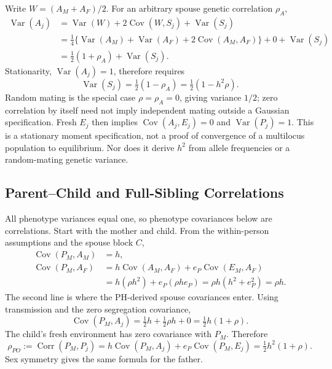 Write $W=(A_M+A_F)/2$. For an arbitrary spouse genetic correlation
$\rho_A$,
\begin{align*}
 \operatorname{Var}(A_j)
 &=\operatorname{Var}(W)+2\operatorname{Cov}(W,S_j)
   +\operatorname{Var}(S_j)\\
 &=\tfrac14\{\operatorname{Var}(A_M)+\operatorname{Var}(A_F)
              +2\operatorname{Cov}(A_M,A_F)\}
   +0+\operatorname{Var}(S_j)\\
 &=\tfrac12(1+\rho_A)+\operatorname{Var}(S_j).
\end{align*}
Stationarity, $\operatorname{Var}(A_j)=1$, therefore requires
\begin{equation}
 \boxed{\operatorname{Var}(S_j)=\tfrac12(1-\rho_A)
          =\tfrac12(1-h^2\rho).}
 \label{eq:model-segregation}
\end{equation}
Random mating is the special case $\rho=\rho_A=0$, giving variance
$1/2$; zero correlation by itself need not imply independent mating
outside a Gaussian specification. Fresh $E_j$ then implies
$\operatorname{Cov}(A_j,E_j)=0$ and $\operatorname{Var}(P_j)=1$.
This is a stationary moment specification, not a proof of convergence
of a multilocus population to equilibrium. Nor does it derive $h^2$
from allele frequencies or a random-mating genetic variance.

\subsection{Parent--Child and Full-Sibling Correlations}
\label{sec:model-nuclear}

All phenotype variances equal one, so phenotype covariances below
are correlations. Start with the mother and child. From the
within-person assumptions and the spouse block $C$,
\begin{align*}
 \operatorname{Cov}(P_M,A_M)&=h,\\
 \operatorname{Cov}(P_M,A_F)
 &=h\operatorname{Cov}(A_M,A_F)+e_P\operatorname{Cov}(E_M,A_F)\\
 &=h(\rho h^2)+e_P(\rho h e_P)
   =\rho h(h^2+e_P^2)=\rho h.
\end{align*}
The second line is where the PH-derived spouse covariances enter.
Using transmission and the zero segregation covariance,
\[
 \operatorname{Cov}(P_M,A_j)
 =\tfrac12 h+\tfrac12\rho h+0=\tfrac12h(1+\rho).
\]
The child's fresh environment has zero covariance with $P_M$. Therefore
\begin{equation}
 \rho_{PO}:=\operatorname{Corr}(P_M,P_j)
 =h\operatorname{Cov}(P_M,A_j)+e_P\operatorname{Cov}(P_M,E_j)
 =\boxed{\tfrac12h^2(1+\rho).}
 \label{eq:po}
\end{equation}
Sex symmetry gives the same formula for the father.

